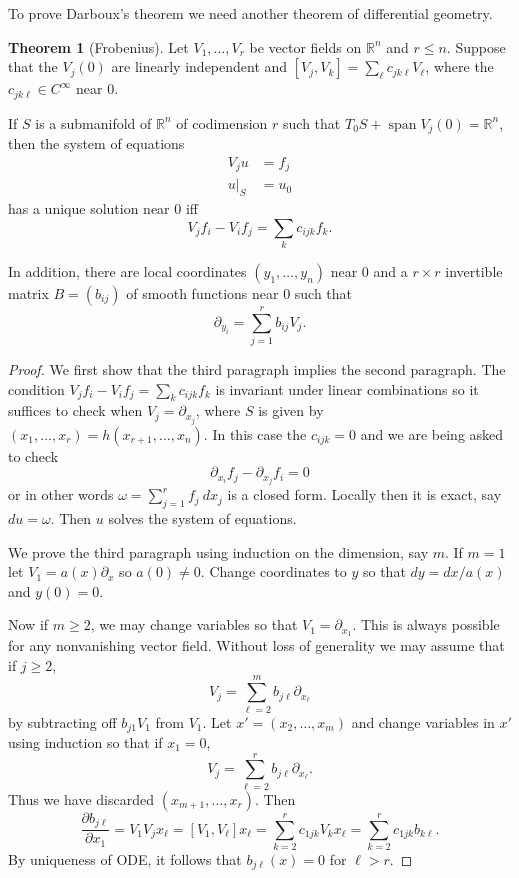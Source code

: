 \documentclass[12pt]{report}
\newcommand{\RR}{\mathbb{R}}
\newcommand{\spn}{\operatorname{span}}
\theoremstyle{definition}
\newtheorem{theorem}{Theorem}[chapter]
\begin{document}
To prove Darboux's theorem we need another theorem of differential geometry.
\begin{theorem}[Frobenius]
Let $V_1, \dots, V_r$ be vector fields on $\RR^n$ and $r \leq n$. Suppose that the $V_j(0)$ are linearly independent and $[V_j, V_k] = \sum_\ell c_{jk\ell} V_\ell$, where the $c_{jk\ell} \in C^\infty$ near $0$.

If $S$ is a submanifold of $\RR^n$ of codimension $r$ such that $T_0S+ \spn V_j(0) = \RR^n$, then the system of equations
\begin{align*}
V_ju&=f_j\\
u|_S&=u_0
\end{align*}
has a unique solution near $0$ iff
$$V_jf_i- V_if_j = \sum_k c_{ijk}f_k.$$

In addition, there are local coordinates $(y_1, \dots, y_n)$ near $0$ and a $r \times r$ invertible matrix $B = (b_{ij})$ of smooth functions near $0$ such that
$$\partial_{y_i} = \sum_{j=1}^r b_{ij}V_j.$$
\end{theorem}
\begin{proof}
We first show that the third paragraph implies the second paragraph. The condition $V_jf_i - V_if_j = \sum_k c_{ijk}f_k$ is invariant under linear combinations so it suffices to check when $V_j = \partial_{x_j}$, where $S$ is given by $(x_1, \dots, x_r) = h(x_{r+1}, \dots, x_n)$.
In this case the $c_{ijk} = 0$ and we are being asked to check
$$\partial_{x_i}f_j - \partial_{x_j}f_i= 0$$
or in other words $\omega = \sum_{j=1}^rf_j~dx_j$ is a closed form. Locally then it is exact, say $du = \omega$. Then $u$ solves the system of equations.

We prove the third paragraph using induction on the dimension, say $m$. If $m = 1$ let $V_1 = a(x)\partial_x$ so $a(0) \neq 0$. Change coordinates to $y$ so that $dy = dx/a(x)$ and $y(0) = 0$.

Now if $m \geq 2$, we may change variables so that $V_1 = \partial_{x_1}$. This is always possible for any nonvanishing vector field. Without loss of generality we may assume that if $j \geq 2$,
$$V_j = \sum_{\ell=2}^m b_{j\ell} \partial_{x_\ell}$$
by subtracting off $b_{j1}V_1$ from $V_1$.
Let $x' = (x_2, \dots, x_m)$ and change variables in $x'$ using induction so that if $x_1 = 0$,
$$V_j = \sum_{\ell=2}^r b_{j\ell}\partial_{x_\ell}.$$
Thus we have discarded $(x_{m+1}, \dots, x_r)$.
Then
$$\frac{\partial b_{j\ell}}{\partial x_1} = V_1V_jx_\ell = [V_1, V_\ell]x_\ell = \sum_{k=2}^r c_{1jk}V_kx_\ell= \sum_{k=2}^r c_{1jk}b_{k\ell}.$$
By uniqueness of ODE, it follows that $b_{j\ell}(x) = 0$ for $\ell > r$.
\end{proof}
\end{document}
